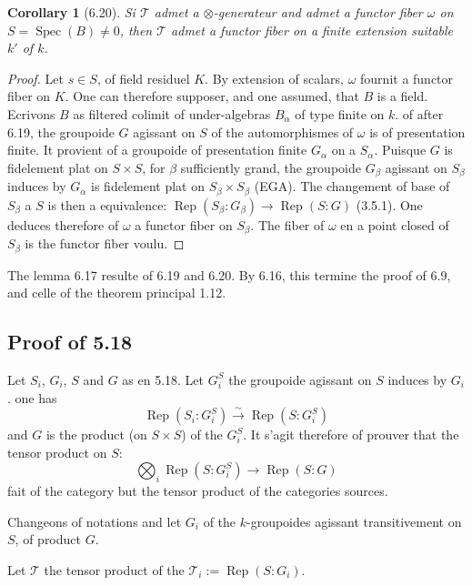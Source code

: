 \documentclass[12pt,a4paper]{article}
\theoremstyle{plain}
\newtheorem{corollary}[theorem]{Corollary}
\theoremstyle{definition}
\DeclareMathOperator{\Spec}{Spec}
\DeclareMathOperator{\Rep}{Rep}
\begin{document}
\begin{corollary}[6.20]
Si $\mathcal{T}$ admet a $\otimes$-generateur and admet a functor fiber $\omega$ on $S = \Spec(B) \neq 0$, then $\mathcal{T}$ admet a functor fiber on a finite extension suitable $k'$ of $k$.
\end{corollary}

\begin{proof}
Let $s \in S$, of field residuel $K$. By extension of scalars, $\omega$ fournit a functor fiber on $K$. One can therefore supposer, and one assumed, that $B$ is a field. Ecrivons $B$ as filtered colimit of under-algebras $B_\alpha$ of type finite on $k$. of after 6.19, the groupoide $G$ agissant on $S$ of the automorphismes of $\omega$ is of presentation finite. It provient of a groupoide of presentation finite $G_\alpha$ on a $S_\alpha$. Puisque $G$ is fidelement plat on $S \times S$, for $\beta$ sufficiently grand, the groupoide $G_\beta$ agissant on $S_\beta$ induces by $G_\alpha$ is fidelement plat on $S_\beta \times S_\beta$ (EGA). The changement of base of $S_\beta$ a $S$ is then a equivalence: $\Rep(S_\beta : G_\beta) \to \Rep(S : G)$ (3.5.1). One deduces therefore of $\omega$ a functor fiber on $S_\beta$. The fiber of $\omega$ en a point closed of $S_\beta$ is the functor fiber voulu.
\end{proof}

The lemma 6.17 resulte of 6.19 and 6.20. By 6.16, this termine the proof of 6.9, and celle of the theorem principal 1.12.

\subsection{Proof of 5.18}

Let $S_i$, $G_i$, $S$ and $G$ as en 5.18. Let $G_i^S$ the groupoide agissant on $S$ induces by $G_i$. one has
\[
\Rep(S_i : G_i^S) \xrightarrow{\sim} \Rep(S : G_i^S)
\]
and $G$ is the product (on $S \times S$) of the $G_i^S$. It s'agit therefore of prouver that the tensor product on $S$:
\begin{equation}\label{eq:6.21.1}
\bigotimes_i \Rep(S : G_i^S) \to \Rep(S : G)
\end{equation}
fait of the category but the tensor product of the categories sources.

Changeons of notations and let $G_i$ of the $k$-groupoides agissant transitivement on $S$, of product $G$.

Let $\mathcal{T}$ the tensor product of the $\mathcal{T}_i := \Rep(S : G_i)$.
\end{document}
